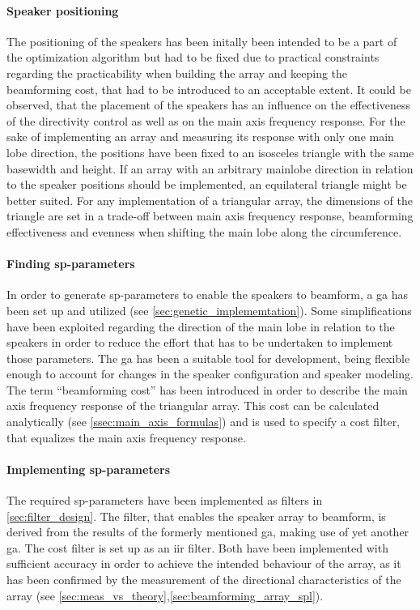 \paragraph{Speaker positioning}
The positioning of the speakers has been initally been intended to be a part of the optimization algorithm but had to be fixed due to practical constraints regarding the practicability when building the array and keeping the beamforming cost, that had to be introduced to an acceptable extent. It could be observed, that the placement of the speakers has an influence on the effectiveness of the directivity control as well as on the main axis frequency response. For the sake of implementing an array and measuring its response with only one main lobe direction, the positions have been fixed to an isosceles triangle with the same basewidth and height. If an array with an arbitrary mainlobe direction in relation to the speaker positions should be implemented, an equilateral triangle might be better suited. For any implementation of a triangular array, the dimensions of the triangle are set in a trade-off between main axis frequency response, beamforming effectiveness and evenness when shifting the main lobe along the circumference.
\paragraph{Finding \gls{sp}-parameters}
In order to generate \gls{sp}-parameters to enable the speakers to beamform, a \gls{ga} has been set up and utilized (see \autoref{sec:genetic_implememtation}). Some simplifications have been exploited regarding the direction of the main lobe in relation to the speakers in order to reduce the effort that has to be undertaken to implement those parameters. The \gls{ga} has been a suitable tool for development, being flexible enough to account for changes in the speaker configuration and speaker modeling.\\
The term ``beamforming cost'' has been introduced in order to describe the main axis frequency response of the triangular array. This cost can be calculated analytically (see \autoref{ssec:main_axis_formulas}) and is used to specify a cost filter, that equalizes the main axis frequency response.
\paragraph{Implementing \gls{sp}-parameters}
The required \gls{sp}-parameters have been implemented as filters in \autoref{sec:filter_design}. The filter, that enables the speaker array to beamform, is derived from the results of the formerly mentioned \gls{ga}, making use of yet another \gls{ga}. The cost filter is set up as an \gls{iir} filter. Both have been implemented with sufficient accuracy in order to achieve the intended behaviour of the array, as it has been confirmed by the measurement of the directional characteristics of the array (see \autoref{sec:meas_vs_theory},\autoref{sec:beamforming_array_spl}). 
